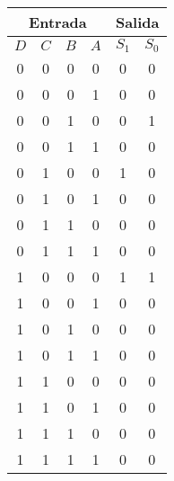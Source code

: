 \begin{table}[H]
	\begin{center}
		\begin{tabular}{|c|c|c|c||c|c|}
			\hline
			\multicolumn{4}{|c||}{Entrada} & \multicolumn{2}{|c|}{Salida}\\
			\hline
			$D$ &	$C$ &	$B$ &	$A$ & $S_1$ & $S_0$ \\
			\hline
            0 & 0 & 0 & 0 & 0 & 0   \\
            \hline
            0 & 0 & 0 & 1 & 0 & 0   \\
            \hline
            0 & 0 & 1 & 0 & 0 & 1   \\
            \hline
            0 & 0 & 1 & 1 & 0 & 0   \\
            \hline
            0 & 1 & 0 & 0 & 1 & 0   \\
            \hline
            0 & 1 & 0 & 1 & 0 & 0   \\
            \hline
            0 & 1 & 1 & 0 & 0 & 0   \\
            \hline
            0 & 1 & 1 & 1 & 0 & 0   \\
            \hline
            1 & 0 & 0 & 0 & 1 & 1   \\
            \hline
            1 & 0 & 0 & 1 & 0 & 0   \\
            \hline
            1 & 0 & 1 & 0 & 0 & 0   \\
            \hline
            1 & 0 & 1 & 1 & 0 & 0  \\
            \hline
            1 & 1 & 0 & 0 & 0 & 0   \\
            \hline
            1 & 1 & 0 & 1 & 0 & 0   \\
            \hline
            1 & 1 & 1 & 0 & 0 & 0   \\
            \hline
            1 & 1 & 1 & 1 & 0 & 0  \\
			\hline
		\end{tabular}
	\end{center}
\end{table}